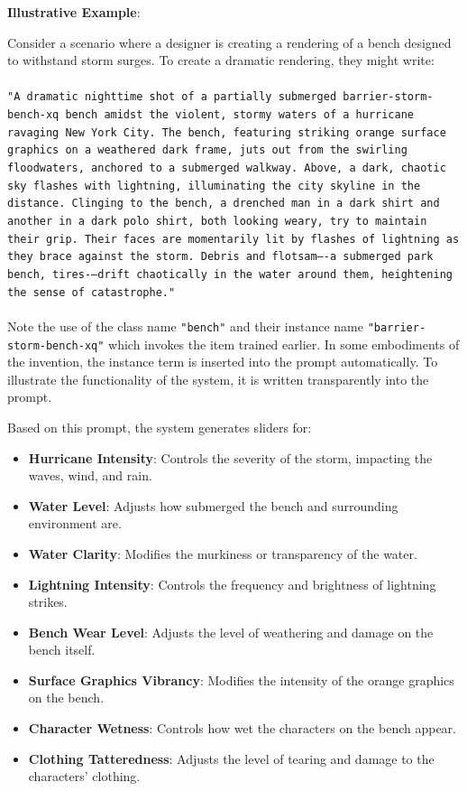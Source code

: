 \documentclass[12pt]{article}
\begin{document}
\textbf{Illustrative Example}:

Consider a scenario where a designer is creating a rendering of a bench designed to withstand storm surges. To create a dramatic rendering, they might write:
\paragraph{}
\texttt{"A dramatic nighttime shot of a partially submerged barrier-storm-bench-xq bench amidst the violent, stormy waters of a hurricane ravaging New York City. The bench, featuring striking orange surface graphics on a weathered dark frame, juts out from the swirling floodwaters, anchored to a submerged walkway. Above, a dark, chaotic sky flashes with lightning, illuminating the city skyline in the distance. Clinging to the bench, a drenched man in a dark shirt and another in a dark polo shirt, both looking weary, try to maintain their grip. Their faces are momentarily lit by flashes of lightning as they brace against the storm. Debris and flotsam—-a submerged park bench, tires-—drift chaotically in the water around them, heightening the sense of catastrophe." }
\paragraph{}
Note the use of the class name \texttt{"bench"} and their instance name \texttt{"barrier-storm-bench-xq"} which invokes the item trained earlier. In some embodiments of the invention, the instance term is inserted into the prompt automatically. To illustrate the functionality of the system, it is written transparently into the prompt.

Based on this prompt, the system generates sliders for:

\begin{itemize}
    \item \textbf{Hurricane Intensity}: Controls the severity of the storm, impacting the waves, wind, and rain.
    \item \textbf{Water Level}: Adjusts how submerged the bench and surrounding environment are.
    \item \textbf{Water Clarity}: Modifies the murkiness or transparency of the water.
    \item \textbf{Lightning Intensity}: Controls the frequency and brightness of lightning strikes.
    \item \textbf{Bench Wear Level}: Adjusts the level of weathering and damage on the bench itself.
    \item \textbf{Surface Graphics Vibrancy}: Modifies the intensity of the orange graphics on the bench.
    \item \textbf{Character Wetness}: Controls how wet the characters on the bench appear.
    \item \textbf{Clothing Tatteredness}: Adjusts the level of tearing and damage to the characters' clothing.
\end{itemize}
\end{document}
